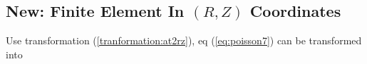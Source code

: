 \documentclass{report}
\newcommand{\pp}[2]{\frac{\partial{#1}}{\partial{#2}}}
\newcommand{\psp}[2]{\frac{\partial^2{#1}}{\partial{#2}^2}}
\begin{document}



\subsection{New: Finite Element In $(R,Z)$ Coordinates}
\label{sec:felement_new}
Use transformation (\ref{tranformation:at2rz}), eq (\ref{eq:poisson7}) can be transformed into
\end{document}
